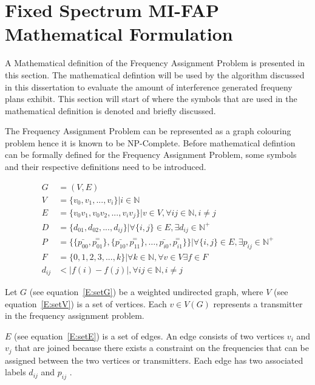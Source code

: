 \section{Fixed Spectrum MI-FAP Mathematical Formulation}
\label{sec:FAPMathDef}
A Mathematical definition of the Frequency Assignment Problem is presented in this section. The mathematical defintion will be used by the algorithm discussed in this dissertation to evaluate the amount of interference generated frequeny plans exhibit. This section will start of where the symbols that are used in the mathematical definition is denoted and briefly discussed.

The Frequency Assignment Problem can be represented as a graph colouring problem hence it is known to be NP-Complete. Before mathematical defintion can be formally defined for the Frequency Assignment Problem, some symbols and their respective definitions need to be introduced.

\begin{align}
	G &= (V,E) \label{E:setG}\\
	V &= \{v_{0},v_{1},...,v_{i}\} | i \in \mathbb{N} \label{E:setV}\\
	E &= \{v_0v_1,v_0v_2,...,v_iv_j\}|v \in V,\forall ij \in \mathbb{N},i \neq j \label{E:setE}\\
	D &= \{d_{01},d_{02},...,d_{ij}\}| \forall\{i,j\} \in E, \exists d_{ij} \in \mathbb{N}^+ \label{E:setD}\\
	P &= \{\{\bar{p_{00}},\overset{=}{p_{01}}\},\{\bar{p_{10}},\overset{=}{p_{11}}\},\ldots,\bar{p_{i0}},\overset{=}{p_{i1}}\}\}| \forall \{i,j\} \in E,\exists p_{ij} \in \mathbb{N}^+ \label{E:setP}\\
	F &= \{0,1,2,3,...,k\}| \forall k \in \mathbb{N},\forall v \in V \exists f \in F\label{E:setF}\\
	d_{ij} &< |f(i) - f(j)|, \forall ij \in \mathbb{N},i \neq j \label{E:interference}
\end{align}

Let $G$ (see equation~\ref{E:setG}) be a weighted undirected graph, where $V$ (see equation~\ref{E:setV}) is a set of vertices. Each $v \in V(G)$ represents a transmitter in the frequency assignment problem. 

$E$ (see equation~\ref{E:setE}) is a set of edges. An edge consists of two vertices $v_i$ and $v_j$ that are joined because there exists a constraint on the frequencies that can be assigned between the two vertices or transmitters. Each edge has two associated labels $d_{ij}$ and $p_{ij}$ \cite{FAPOrientationModel,TabuMontemanniSmith}. 

